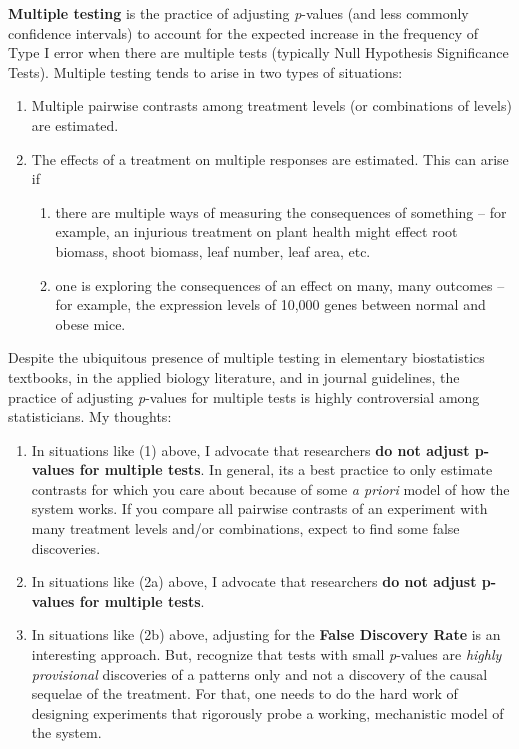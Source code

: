 \documentclass[]{book}
\providecommand{\tightlist}{%
  \setlength{\itemsep}{0pt}\setlength{\parskip}{0pt}}
\begin{document}
\textbf{Multiple testing} is the practice of adjusting \emph{p}-values (and less commonly confidence intervals) to account for the expected increase in the frequency of Type I error when there are multiple tests (typically Null Hypothesis Significance Tests). Multiple testing tends to arise in two types of situations:

\begin{enumerate}
\def\labelenumi{\arabic{enumi}.}
\tightlist
\item
  Multiple pairwise contrasts among treatment levels (or combinations of levels) are estimated.
\item
  The effects of a treatment on multiple responses are estimated. This can arise if

  \begin{enumerate}
  \def\labelenumii{\alph{enumii}.}
  \tightlist
  \item
    there are multiple ways of measuring the consequences of something -- for example, an injurious treatment on plant health might effect root biomass, shoot biomass, leaf number, leaf area, etc.
  \item
    one is exploring the consequences of an effect on many, many outcomes -- for example, the expression levels of 10,000 genes between normal and obese mice.
  \end{enumerate}
\end{enumerate}

Despite the ubiquitous presence of multiple testing in elementary biostatistics textbooks, in the applied biology literature, and in journal guidelines, the practice of adjusting \emph{p}-values for multiple tests is highly controversial among statisticians. My thoughts:

\begin{enumerate}
\def\labelenumi{\arabic{enumi}.}
\tightlist
\item
  In situations like (1) above, I advocate that researchers \textbf{do not adjust p-values for multiple tests}. In general, its a best practice to only estimate contrasts for which you care about because of some \emph{a priori} model of how the system works. If you compare all pairwise contrasts of an experiment with many treatment levels and/or combinations, expect to find some false discoveries.
\item
  In situations like (2a) above, I advocate that researchers \textbf{do not adjust p-values for multiple tests}.
\item
  In situations like (2b) above, adjusting for the \textbf{False Discovery Rate} is an interesting approach. But, recognize that tests with small \emph{p}-values are \emph{highly provisional} discoveries of a patterns only and not a discovery of the causal sequelae of the treatment. For that, one needs to do the hard work of designing experiments that rigorously probe a working, mechanistic model of the system.
\end{enumerate}
\end{document}
